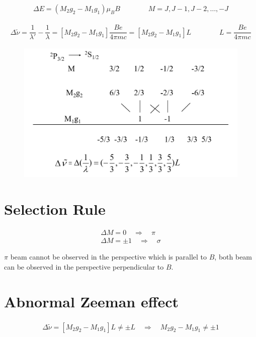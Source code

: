 \begin{equation*}
  \begin{aligned}
    \Delta E = \left( M_2 g_2 - M_1 g_1 \right) \mu_B B 
    \quad\quad 
    \quad\quad 
    M = J,J-1,J-2,\dots,-J
  \end{aligned}
\end{equation*}

\begin{equation*}
  \begin{aligned}
    \Delta \tilde{\nu} = \dfrac{1}{\lambda'} - \dfrac{1}{\lambda} = \left[ M_2 g_2 - M_1 g_1\right] \dfrac{Be}{4 \pi m c} = \left[ M_2 g_2 - M_1 g_1 \right] L
    \quad\quad
    \quad\quad
    L = \dfrac{Be}{4 \pi m c} 
  \end{aligned}
\end{equation*}

\begin{figure}[H]
  \centering
  \includegraphics[width=0.7\linewidth]{figures/energy-magnetic-2.png}
\end{figure}

\section{Selection Rule}

\begin{equation*}
  \begin{aligned}
    \Delta M = 0 \quad \Rightarrow \quad \pi \\
    \Delta M = \pm 1 \quad \Rightarrow \quad \sigma
  \end{aligned}
\end{equation*}

$\pi$ beam cannot be observed in the perspective which is parallel to $B$, both beam can be observed in the perspective perpendicular to $B$.

\section{Abnormal Zeeman effect}

\begin{equation*}
  \begin{aligned}
    \Delta \tilde{\nu} = \left[ M_2 g_2 - M_1 g_1 \right] L \neq \pm L
    \quad \Rightarrow \quad
    M_2 g_2 - M_1 g_1 \neq \pm 1
  \end{aligned}
\end{equation*}

